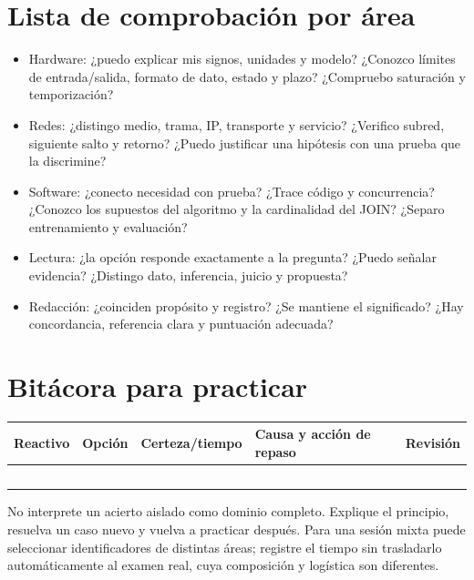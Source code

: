 \section{Lista de comprobación por área}
\begin{itemize}
\item Hardware: ¿puedo explicar mis signos, unidades y modelo? ¿Conozco límites de entrada/salida, formato de dato, estado y plazo? ¿Compruebo saturación y temporización?
\item Redes: ¿distingo medio, trama, IP, transporte y servicio? ¿Verifico subred, siguiente salto y retorno? ¿Puedo justificar una hipótesis con una prueba que la discrimine?
\item Software: ¿conecto necesidad con prueba? ¿Trace código y concurrencia? ¿Conozco los supuestos del algoritmo y la cardinalidad del JOIN? ¿Separo entrenamiento y evaluación?
\item Lectura: ¿la opción responde exactamente a la pregunta? ¿Puedo señalar evidencia? ¿Distingo dato, inferencia, juicio y propuesta?
\item Redacción: ¿coinciden propósito y registro? ¿Se mantiene el significado? ¿Hay concordancia, referencia clara y puntuación adecuada?
\end{itemize}
\section{Bitácora para practicar}
\begin{longtable}{>{\raggedright\arraybackslash}p{}>{\raggedright\arraybackslash}p{}>{\raggedright\arraybackslash}p{}>{\raggedright\arraybackslash}p{}>{\raggedright\arraybackslash}p{}}
\toprule Reactivo & Opción & Certeza/tiempo & Causa y acción de repaso & Revisión\\\midrule\endhead
\rule{0pt}{1.1cm} & & & & \\
\rule{0pt}{1.1cm} & & & & \\
\rule{0pt}{1.1cm} & & & & \\
\rule{0pt}{1.1cm} & & & & \\
\rule{0pt}{1.1cm} & & & & \\
\bottomrule
\end{longtable}
No interprete un acierto aislado como dominio completo. Explique el principio, resuelva un caso nuevo y vuelva a practicar después. Para una sesión mixta puede seleccionar identificadores de distintas áreas; registre el tiempo sin trasladarlo automáticamente al examen real, cuya composición y logística son diferentes.
